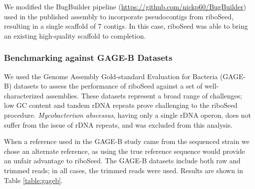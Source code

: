 \documentclass[10pt]{article}
\begin{document}
\begin{linenumbers}
We modified the BugBuilder pipeline (\url{https://github.com/nickp60/BugBuilder}) used in the published assembly to incorporate pseudocontigs from riboSeed, resulting in a single scaffold of 7 contigs. In this case, riboSeed was able to bring an existing high-quality scaffold to completion.

\subsubsection*{Benchmarking against GAGE-B Datasets}
We used the Genome Assembly Gold-standard Evaluation for Bacteria (GAGE-B) datasets \cite{Magoc2013} to assess the performance of riboSeed against a set of well-characterized assemblies. These datasets represent a broad range of challenges; low GC content and tandem rDNA repeats prove challenging to the riboSeed procedure. \textit{Mycobacterium abscessus}, having only a single rDNA operon, does not suffer from the issue of rDNA repeats, and was excluded from this analysis.


When a reference used in the GAGE-B study came from the sequenced strain we chose an alternate reference, as using the true reference sequence would provide an unfair advantage to riboSeed. The GAGE-B datasets include both raw and trimmed reads; in all cases, the trimmed reads were used. Results are shown in Table \ref{table:gageb}.


\end{linenumbers}
\end{document}
